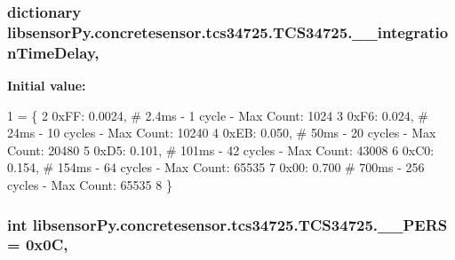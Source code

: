 \subsubsection[{\+\_\+\+\_\+integration\+Time\+Delay}]{\setlength{\rightskip}{0pt plus 5cm}dictionary libsensor\+Py.\+concretesensor.\+tcs34725.\+T\+C\+S34725.\+\_\+\+\_\+integration\+Time\+Delay\hspace{0.3cm}{\ttfamily [static]}, {\ttfamily [private]}}\label{classlibsensorPy_1_1concretesensor_1_1tcs34725_1_1TCS34725_a21bdcdb2b1932e8a0944dd1f7fad3676}
{\bfseries Initial value\+:}
\begin{DoxyCode}
1 = \{
2         0xFF: 0.0024,  \textcolor{comment}{# 2.4ms - 1 cycle    - Max Count: 1024}
3         0xF6: 0.024,   \textcolor{comment}{# 24ms  - 10 cycles  - Max Count: 10240}
4         0xEB: 0.050,   \textcolor{comment}{# 50ms  - 20 cycles  - Max Count: 20480}
5         0xD5: 0.101,   \textcolor{comment}{# 101ms - 42 cycles  - Max Count: 43008}
6         0xC0: 0.154,   \textcolor{comment}{# 154ms - 64 cycles  - Max Count: 65535}
7         0x00: 0.700    \textcolor{comment}{# 700ms - 256 cycles - Max Count: 65535}
8     \}
\end{DoxyCode}
\hypertarget{classlibsensorPy_1_1concretesensor_1_1tcs34725_1_1TCS34725_a0ac6496a794b302942e19410545bb7bc}{}
\subsubsection[{\+\_\+\+\_\+\+P\+E\+R\+S}]{\setlength{\rightskip}{0pt plus 5cm}int libsensor\+Py.\+concretesensor.\+tcs34725.\+T\+C\+S34725.\+\_\+\+\_\+\+P\+E\+R\+S = 0x0\+C\hspace{0.3cm}{\ttfamily [static]}, {\ttfamily [private]}}\label{classlibsensorPy_1_1concretesensor_1_1tcs34725_1_1TCS34725_a0ac6496a794b302942e19410545bb7bc}
\hypertarget{classlibsensorPy_1_1concretesensor_1_1tcs34725_1_1TCS34725_a9b6676b055ec23f275513082833ef60f}{}
